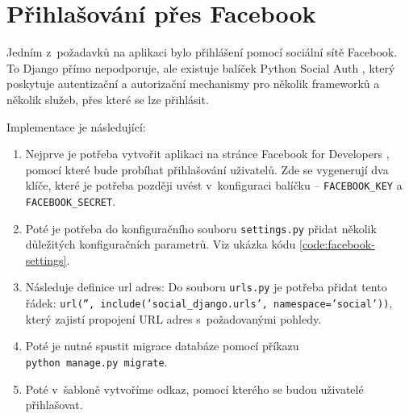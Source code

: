 \section{Přihlašování přes Facebook}

\begin{sloppypar}
Jedním z~požadavků na aplikaci bylo přihlášení pomocí sociální sítě Facebook. To Django přímo nepodporuje, ale existuje balíček Python Social Auth \cite{python-social-auth}, který poskytuje autentizační a autorizační mechanismy pro několik frameworků a několik služeb, přes které se lze přihlásit.

Implementace je následující:
\begin{enumerate}
    \item Nejprve je potřeba vytvořit aplikaci na stránce Facebook for Developers \cite{facebook-developers}, pomocí které bude probíhat přihlašování uživatelů. Zde se vygenerují dva klíče, které je potřeba později uvést v~konfiguraci balíčku -- \texttt{FACEBOOK\_KEY} a \texttt{FACEBOOK\_SECRET}.
    \item Poté je potřeba do konfiguračního souboru \texttt{settings.py} přidat několik důležitých konfiguračních parametrů. Viz ukázka kódu \ref{code:facebook-settings}.
    \item Následuje definice url adres: Do souboru \texttt{urls.py} je potřeba přidat tento řádek: \mbox{\texttt{url('', include('social\_django.urls', namespace='social'))}}, který zajistí propojení URL adres s~požadovanými pohledy.
    \item Poté je nutné spustit migrace databáze pomocí příkazu \\\texttt{python manage.py migrate}.
    \item Poté v~šabloně vytvoříme odkaz, pomocí kterého se budou uživatelé přihlašovat.
\end{enumerate}
\end{sloppypar}

